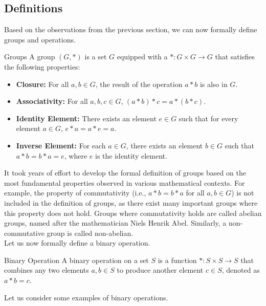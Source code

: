 \documentclass[openany]{book}
\begin{document}
\subsection{Definitions}
Based on the observations from the previous section, we can now formally define groups and operations.
\begin{mydefinition}{Groups}
    A group \( (G, *) \) is a set \( G \) equipped with a  \( * : G \times G \to G \) that satisfies the following properties:
    \begin{itemize}
        \item \textbf{Closure:} For all \( a, b \in G \), the result of the operation \( a * b \) is also in \( G \).
        \item \textbf{Associativity:} For all \( a, b, c \in G \), \( (a * b) * c = a * (b * c) \).
        \item \textbf{Identity Element:} There exists an element \( e \in G \) such that for every element \( a \in G \), \( e * a = a * e = a \).
        \item \textbf{Inverse Element:} For each \( a \in G \), there exists an element \( b \in G \) such that \( a * b = b * a = e \), where \( e \) is the identity element.
    \end{itemize}
\end{mydefinition}
It took years of effort to develop the formal definition of groups based on the most fundamental properties observed in various mathematical contexts. For example, the property of commutativity (i.e., \( a * b = b * a \) for all \( a, b \in G \)) is not included in the definition of groups, as there exist many important groups where this property does not hold. Groups where commutativity holds are called abelian groups, named after the mathematician Niels Henrik Abel. Similarly, a non-commutative group is called non-abelian. \\
Let us now formally define a binary operation. 
\begin{mydefinition}{Binary Operation}
    A binary operation on a set \( S \) is a function \( * : S \times S \to S \) that combines any two elements \( a, b \in S \) to produce another element \( c \in S \), denoted as \( a * b = c \). 
\end{mydefinition}
Let us consider some examples of binary operations.
\end{document}
